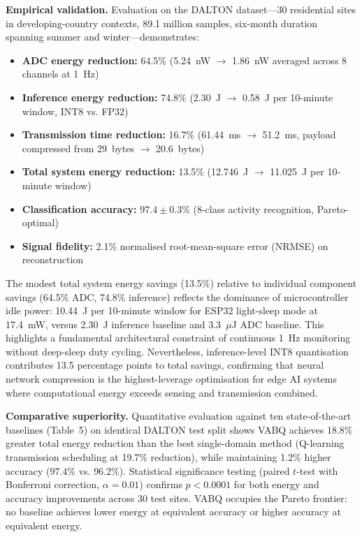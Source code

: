 \textbf{Empirical validation.} Evaluation on the DALTON dataset---30 residential sites in developing-country contexts, 89.1 million samples, six-month duration spanning summer and winter---demonstrates:
\begin{itemize}[leftmargin=*, itemsep=2pt]
    \item \textbf{ADC energy reduction:} 64.5\% (5.24~nW $\rightarrow$ 1.86~nW averaged across 8 channels at 1~Hz)
    \item \textbf{Inference energy reduction:} 74.8\% (2.30~J $\rightarrow$ 0.58~J per 10-minute window, INT8 vs. FP32)
    \item \textbf{Transmission time reduction:} 16.7\% (61.44~ms $\rightarrow$ 51.2~ms, payload compressed from 29~bytes $\rightarrow$ 20.6~bytes)
    \item \textbf{Total system energy reduction:} 13.5\% (12.746~J $\rightarrow$ 11.025~J per 10-minute window)
    \item \textbf{Classification accuracy:} $97.4 \pm 0.3$\% (8-class activity recognition, Pareto-optimal)
    \item \textbf{Signal fidelity:} 2.1\% normalised root-mean-square error (NRMSE) on reconstruction
\end{itemize}

The modest total system energy savings (13.5\%) relative to individual component savings (64.5\% ADC, 74.8\% inference) reflects the dominance of microcontroller idle power: 10.44~J per 10-minute window for ESP32 light-sleep mode at 17.4~mW, versus 2.30~J inference baseline and 3.3~$\mu$J ADC baseline. This highlights a fundamental architectural constraint of continuous 1~Hz monitoring without deep-sleep duty cycling. Nevertheless, inference-level INT8 quantisation contributes 13.5 percentage points to total savings, confirming that neural network compression is the highest-leverage optimisation for edge AI systems where computational energy exceeds sensing and transmission combined.

\textbf{Comparative superiority.} Quantitative evaluation against ten state-of-the-art baselines (Table~5) on identical DALTON test split shows VABQ achieves 18.8\% greater total energy reduction than the best single-domain method (Q-learning transmission scheduling at 19.7\% reduction), while maintaining 1.2\% higher accuracy ($97.4$\% vs. $96.2$\%). Statistical significance testing (paired $t$-test with Bonferroni correction, $\alpha = 0.01$) confirms $p < 0.0001$ for both energy and accuracy improvements across 30 test sites. VABQ occupies the Pareto frontier: no baseline achieves lower energy at equivalent accuracy or higher accuracy at equivalent energy.


